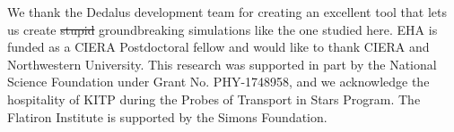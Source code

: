 \documentclass[onecolumn, twocolappendix]{aastex631}
\begin{document}








\begin{acknowledgments}
    We thank the Dedalus development team for creating an excellent tool that lets us create \sout{stupid} groundbreaking simulations like the one studied here.
    EHA is funded as a CIERA Postdoctoral fellow and would like to thank CIERA and Northwestern University. 
    This research was supported in part by the National Science Foundation under Grant No. PHY-1748958, and we acknowledge the hospitality of KITP during the Probes of Transport in Stars Program.
    The Flatiron Institute is supported by the Simons Foundation.
\end{acknowledgments}
\newpage
\appendix







\newpage


\end{document}
